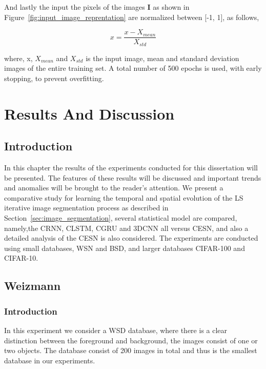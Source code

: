 \documentclass{WitsPhysicsReport}
\begin{document}
And lastly the input the pixels of the images $\mathbf{I}$ as shown in Figure~\ref{fig:input_image_reprentation} are normalized between 
[-1, 1], as follows, 

\begin{equation}
    x = \frac{x - X_{mean}}{X_{std}}
     \label{equ:normalization}
\end{equation}

where, x, $X_{mean}$  and $X_{std}$ is the input image, mean and standard deviation images of the entire training set. A total number of 500 epochs is used, with early stopping, to prevent overfitting.

\newpage

\section{Results And Discussion }
\label{sec:Experiments}

\subsection{Introduction}

In this chapter the results of the experiments conducted for this dissertation will be presented. The features of these results will be discussed and important trends and anomalies will be brought to the reader's attention. We present a comparative study for learning the temporal and spatial evolution of the LS iterative image segmentation process as described in Section~\ref{sec:image_segmentation}, several statistical model are compared, namely,the CRNN, CLSTM, CGRU and 3DCNN all versus CESN, and also a detailed analysis of the CESN is also considered. The experiments are conducted using small databases, WSN and BSD, and larger databases CIFAR-100 and CIFAR-10.


\subsection{Weizmann}
\label{sec:Weizmann}

\subsubsection{Introduction}

In this experiment we consider a WSD database, where there is a clear distinction between the foreground and background, the images consist of one or two objects. The database consist of 200 images in total and thus is the smallest database in our experiments.
\end{document}
